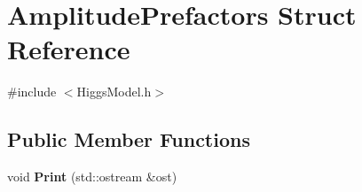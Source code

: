 \hypertarget{structAmplitudePrefactors}{}\section{Amplitude\+Prefactors Struct Reference}
\label{structAmplitudePrefactors}


{\ttfamily \#include $<$Higgs\+Model.\+h$>$}

\subsection*{Public Member Functions}
\begin{DoxyCompactItemize}
\item 
\hypertarget{structAmplitudePrefactors_af5859a1f9403b3900e1a1a798ad071ea}{}void {\bfseries Print} (std\+::ostream \&ost)\label{structAmplitudePrefactors_af5859a1f9403b3900e1a1a798ad071ea}

\end{DoxyCompactItemize}
